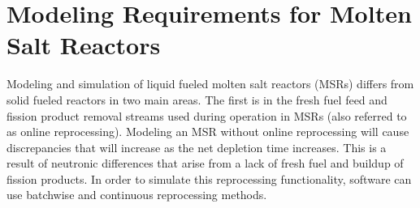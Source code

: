 
\section{Modeling Requirements for Molten Salt Reactors}

Modeling and simulation of liquid fueled molten salt reactors (MSRs) differs from solid fueled reactors in two main areas. The first is in the fresh fuel feed and fission product removal streams used during operation in MSRs (also referred to as online reprocessing). Modeling an MSR without online reprocessing will cause discrepancies that will increase as the net depletion time increases.
This is a result of neutronic differences that arise from a lack of fresh fuel and buildup of fission products. In order to simulate this reprocessing functionality, software can use batchwise and continuous reprocessing methods.


